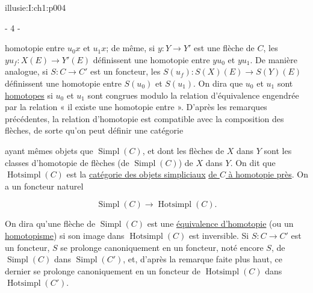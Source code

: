 \IllusieSetPhysicalPageSize{447bp}{698.6bp}
\begin{illusiebodypage}{illusie:I:ch1:p004}
\begin{center}- 4 -\end{center}
\vspace{7bp}\fontsize{9}{18}\selectfont

\hypertarget{illusie:I:ch1:s1:1:p9c1}{}%
\noindent homotopie entre $u_0x$ et $u_1x$; de même, si
$y:Y\longrightarrow Y'$ est une flèche de $C$, les
$yu_f:X(E)\longrightarrow Y'(E)$ définissent une homotopie entre $yu_0$ et
$yu_1$. De manière analogue, si $S:C\longrightarrow C'$ est un foncteur, les
$S(u_f):S(X)(E)\longrightarrow S(Y)(E)$ définissent une homotopie entre
$S(u_0)$ et $S(u_1)$. On dira que $u_0$ et $u_1$ sont
\underline{homotopes} si $u_0$ et $u_1$ sont congrues modulo la relation
d'équivalence engendrée par la relation « il existe une homotopie entre ».
D'après les remarques précédentes, la relation d'homotopie est compatible avec
la composition des flèches, de sorte qu'on peut définir une catégorie

\hypertarget{illusie:I:ch1:s1:1:eq5}{}%
\noindent{}\par

\hypertarget{illusie:I:ch1:s1:1:p10}{}%
ayant mêmes objets que $\operatorname{Simpl}(C)$, et dont les flèches de $X$
dans $Y$ sont les classes d'homotopie de flèches (de
$\operatorname{Simpl}(C)$) de $X$ dans $Y$. On dit que
$\operatorname{Hotsimpl}(C)$ est la
\underline{catégorie des objets simpliciaux} \underline{de $C$ à homotopie
près}. On a un
foncteur naturel

\hypertarget{illusie:I:ch1:s1:1:d7}{}%
\[
  \operatorname{Simpl}(C)\longrightarrow\operatorname{Hotsimpl}(C).
\]

\hypertarget{illusie:I:ch1:s1:1:p11}{}%
On dira qu'une flèche de $\operatorname{Simpl}(C)$ est une
\underline{équivalence d'homotopie} (ou un \underline{homotopisme}) si son
image dans $\operatorname{Hotsimpl}(C)$ est inversible. Si
$S:C\longrightarrow C'$ est un foncteur, $S$ se prolonge canoniquement en un
foncteur, noté encore $S$, de $\operatorname{Simpl}(C)$ dans
$\operatorname{Simpl}(C')$, et, d'après la remarque faite plus haut, ce dernier
se prolonge canoniquement en un foncteur de $\operatorname{Hotsimpl}(C)$ dans
$\operatorname{Hotsimpl}(C')$.


\end{illusiebodypage}
